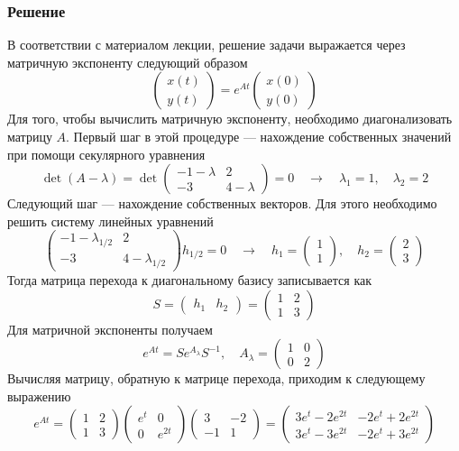 \documentclass[a4paper,12pt]{article}
\begin{document}
\subsubsection*{Решение}
В соответствии с материалом лекции, решение задачи выражается через
матричную экспоненту следующий образом
\[
\begin{pmatrix}
x(t)\\
y(t)
\end{pmatrix}
=
e^{At}
\begin{pmatrix}
x(0)\\
y(0)
\end{pmatrix}
\]
Для того, чтобы вычислить матричную экспоненту, необходимо диагонализовать матрицу $A$. Первый шаг в этой процедуре --- нахождение собственных значений при помощи секулярного уравнения
\[
\det (A-\lambda)=\det \begin{pmatrix}
-1-\lambda & 2\\
-3 & 4-\lambda
\end{pmatrix}=0\quad \rightarrow \quad \lambda_1=1,\quad \lambda_2=2
\]
Следующий шаг --- нахождение собственных векторов. Для этого необходимо решить систему линейных уравнений
\[
\begin{pmatrix}
-1-\lambda_{1/2} & 2\\
-3 & 4-\lambda_{1/2}
\end{pmatrix} h_{1/2}=0\quad \rightarrow \quad 
h_1=
\begin{pmatrix}
1\\
1
\end{pmatrix}
,\quad
h_2=
\begin{pmatrix}
2\\
3
\end{pmatrix}
\]
Тогда матрица перехода к диагональному базису записывается как
\[
S=
\begin{pmatrix}
h_1 & h_2
\end{pmatrix}
=
\begin{pmatrix}
1 & 2\\
1 & 3
\end{pmatrix}
\]
Для матричной экспоненты получаем
\[
e^{At}=Se^{A_\lambda}S^{-1},\quad A_\lambda = 
\begin{pmatrix}
1&0\\
0&2
\end{pmatrix}
\]
Вычисляя матрицу, обратную к матрице перехода, приходим к следующему выражению
\[
e^{At}=
\begin{pmatrix}
1&2\\
1&3
\end{pmatrix}
\begin{pmatrix}
e^t&0\\
0&e^{2t}
\end{pmatrix}
\begin{pmatrix}
3&-2\\
-1&1
\end{pmatrix}
=
\begin{pmatrix}
3e^t-2e^{2t}&-2e^t+2e^{2t}\\
3e^t-3e^{2t}&-2e^t+3e^{2t}
\end{pmatrix}
\]
\end{document}
